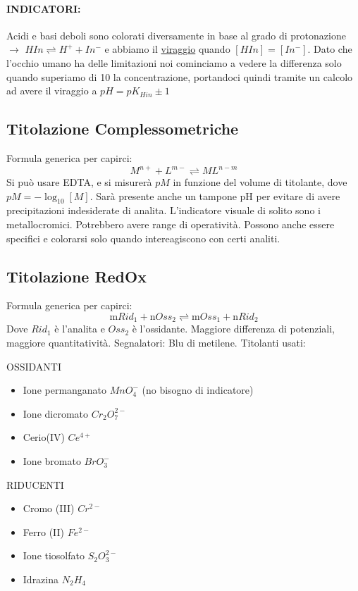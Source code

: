\documentclass{article}
\begin{document}
\paragraph{INDICATORI:} Acidi e basi deboli sono colorati diversamente in base al grado di protonazione $\rightarrow$ $HIn \rightleftharpoons H^+ + In^-$ e abbiamo il \underline{viraggio} quando $[HIn] = [In^-]$. Dato che l'occhio umano ha delle limitazioni noi cominciamo a vedere la differenza solo quando superiamo di 10 la concentrazione, portandoci quindi tramite un calcolo ad avere il viraggio a $pH = pK_{Hin} \pm 1$ 

\subsection{Titolazione Complessometriche} Formula generica per capirci: $$M^{n+} + L^{m-} \rightleftharpoons ML^{n-m}$$  Si può usare EDTA, e si misurerà $pM$ in funzione del volume di titolante, dove $pM = - \log_{10}{[M]}$. Sarà presente anche un tampone pH per evitare di avere precipitazioni indesiderate di analita. L'indicatore visuale di solito sono i metallocromici. Potrebbero avere range di operatività. Possono anche essere specifici e colorarsi solo quando intereagiscono con certi analiti.

\subsection{Titolazione RedOx} Formula generica per capirci: $$\text{m}Rid_1 + \text{n}Oss_2 \rightleftharpoons \text{m}Oss_1 + \text{n}Rid_2$$ Dove $Rid_1$ è l'analita e $Oss_2$ è l'ossidante. Maggiore differenza di potenziali, maggiore quantitatività. Segnalatori: Blu di metilene. Titolanti usati: 

\begin{center}
	\begin{minipage}{0.6\textwidth}
		OSSIDANTI
		\begin{itemize}
		\item Ione permanganato $MnO_4^-$ (no bisogno di indicatore)
		\item Ione dicromato $Cr_2O_7^{2-}$
		\item Cerio(IV) $Ce^{4+}$
		\item Ione bromato $BrO_3^-$
		\end{itemize}		
	\end{minipage}
	\hfill
	\begin{minipage}{0.3\textwidth}
		RIDUCENTI
		\begin{itemize}
		\item Cromo (III) $Cr^{2-}$
		\item Ferro (II) $Fe^{2-}$
		\item Ione tiosolfato $S_2O_3^{2-}$
		\item Idrazina $N_2H_4$
		\end{itemize}		
	\end{minipage}
\end{center}
\end{document}
